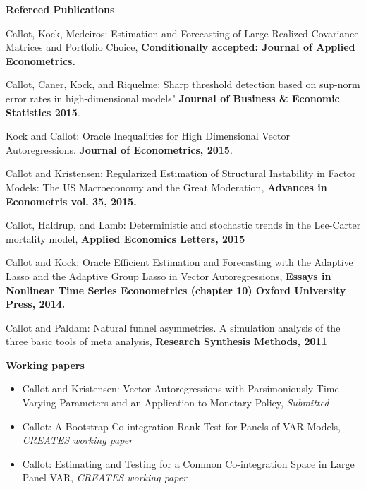 \documentclass[10pt]{article}
\newenvironment{outerlist}[1][\enskip\textbullet]%
        {\begin{itemize}[#1]}{\end{itemize}%
         \vspace{-.1\baselineskip}}
\newenvironment{innerlist}[1][\enskip\textbullet]%
        {\begin{compactitem}[#1]}{\end{compactitem}}
\begin{document}
\begin{outerlist}
\item[] \textbf{Refereed Publications}\\
    \begin{innerlist}
\item[]Callot, Kock, Medeiros: {Estimation and Forecasting of Large Realized Covariance Matrices and Portfolio Choice}, \textbf{Conditionally accepted: Journal of Applied Econometrics.}
\item[Callot, Caner, Kock, and Riquelme:] Sharp threshold detection based on sup-norm error rates in high-dimensional models" \textbf{Journal of Business \& Economic Statistics 2015}.
\item[Kock and Callot:] {Oracle Inequalities for High Dimensional Vector Autoregressions}. \textbf{Journal of Econometrics, 2015}.
\item[Callot and Kristensen:] {Regularized Estimation of Structural Instability in Factor Models: The US Macroeconomy and the Great Moderation}, \textbf{Advances in Econometris vol. 35, 2015.}
\item[Callot, Haldrup, and Lamb:] {Deterministic and stochastic trends in the Lee-Carter mortality model}, \textbf{Applied Economics Letters, 2015}
\item[Callot and Kock:] {Oracle Efficient Estimation and Forecasting with the Adaptive Lasso and the Adaptive Group Lasso in Vector Autoregressions}, \textbf{Essays in Nonlinear Time Series Econometrics (chapter 10) Oxford University Press, 2014.}
\item[Callot and Paldam:] {Natural funnel asymmetries. A simulation analysis of the three basic tools of meta analysis}, \textbf{Research Synthesis Methods, 2011}

    \end{innerlist}

\item[] \textbf{Working papers}\\
    \begin{outerlist}
\item[]Callot and Kristensen: {Vector Autoregressions with Parsimoniously Time-Varying Parameters and an Application to Monetary Policy}, \textit{Submitted}


\item[]Callot: {A Bootstrap Co-integration Rank Test for Panels of VAR Models}, \textit{CREATES working paper}
\item[]Callot: {Estimating and Testing for a Common Co-integration Space in Large Panel VAR}, \textit{CREATES working paper}
    \end{outerlist}

\end{outerlist}
\end{document}
